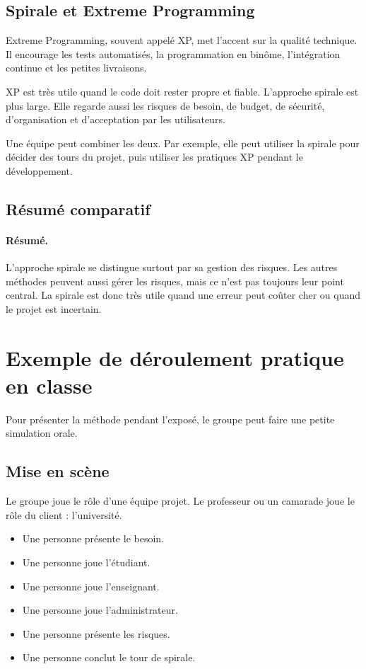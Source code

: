 \documentclass[12pt,a4paper]{article}
\begin{document}
\subsection{Spirale et Extreme Programming}

Extreme Programming, souvent appelé XP, met l'accent sur la qualité technique. Il encourage les tests automatisés, la programmation en binôme, l'intégration continue et les petites livraisons.

XP est très utile quand le code doit rester propre et fiable. L'approche spirale est plus large. Elle regarde aussi les risques de besoin, de budget, de sécurité, d'organisation et d'acceptation par les utilisateurs.

Une équipe peut combiner les deux. Par exemple, elle peut utiliser la spirale pour décider des tours du projet, puis utiliser les pratiques XP pendant le développement.

\subsection{Résumé comparatif}

\paragraph{Résumé.}
L'approche spirale se distingue surtout par sa gestion des risques. Les autres méthodes peuvent aussi gérer les risques, mais ce n'est pas toujours leur point central. La spirale est donc très utile quand une erreur peut coûter cher ou quand le projet est incertain.

\newpage

\section{Exemple de déroulement pratique en classe}

Pour présenter la méthode pendant l'exposé, le groupe peut faire une petite simulation orale.

\subsection{Mise en scène}

Le groupe joue le rôle d'une équipe projet. Le professeur ou un camarade joue le rôle du client : l'université.

\begin{itemize}
    \item Une personne présente le besoin.
    \item Une personne joue l'étudiant.
    \item Une personne joue l'enseignant.
    \item Une personne joue l'administrateur.
    \item Une personne présente les risques.
    \item Une personne conclut le tour de spirale.
\end{itemize}
\end{document}

